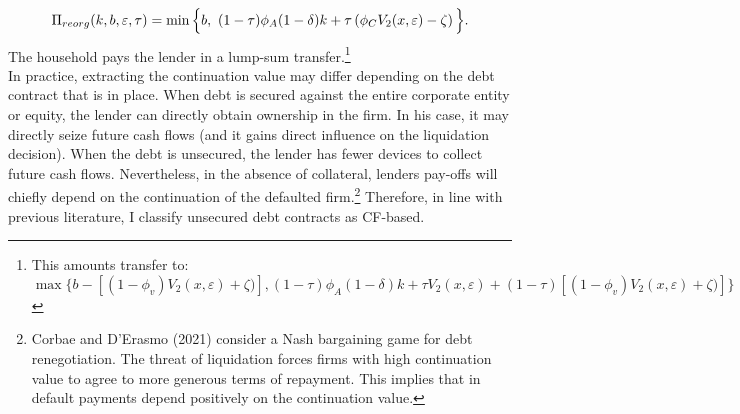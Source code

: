 \documentclass[12pt]{article}
\begin{document}
\begin{equation}  \label{eq:P_reorg}
   \Pi_{reorg}(k,b,\varepsilon,\tau) = \min\Big{\{}b, \ (1-\tau) \phi_A (1-\delta) k +\tau \left( \phi_C V_2 (x, \varepsilon) - \zeta \right) \Big{\}}.
\end{equation}
The household pays the lender in a lump-sum transfer.\footnote{This amounts transfer to: $$ \max \{b - [(1- \phi_v) V_2 (x, \varepsilon) + \zeta)], (1-\tau)\phi_A(1-\delta)k + \tau V_2 (x, \varepsilon) + (1-\tau) [(1- \phi_v) V_2 (x, \varepsilon) + \zeta)]\}  $$} \vspace{3mm} \\
In practice, extracting the continuation value may differ depending on the debt contract that is in place. When debt is secured against the entire corporate entity or equity, the lender can directly obtain ownership in the firm. In his case, it may directly seize future cash flows (and it gains direct influence on the liquidation decision). When the debt is unsecured, the lender has fewer devices to collect future cash flows. Nevertheless, in the absence of collateral, lenders pay-offs will chiefly depend on the continuation of the defaulted firm.\footnote{Corbae and D'Erasmo (2021) consider a Nash bargaining game for debt renegotiation. The threat of liquidation forces firms with high continuation value to agree to more generous terms of repayment. This implies that in default payments depend positively on the continuation value.} Therefore, in line with previous literature, I classify unsecured debt contracts as CF-based. 
\end{document}
